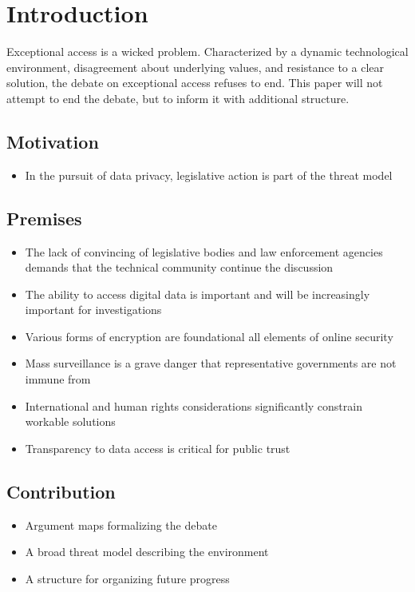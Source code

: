 \chapter{Introduction}

Exceptional access is a wicked problem. Characterized by a dynamic technological environment, disagreement about
underlying values, and resistance to a clear solution, the debate on exceptional access refuses to end. This paper will
not attempt to end the debate, but to inform it with additional structure.

\section{Motivation}

\begin{itemize}
    \item In the pursuit of data privacy, legislative action is part of the threat model
\end{itemize}

\section{Premises}

\begin{itemize}
    \item The lack of convincing of legislative bodies and law enforcement agencies demands that the technical community continue the discussion
    \item The ability to access digital data is important and will be increasingly important for investigations
    \item Various forms of encryption are foundational all elements of online security
    \item Mass surveillance is a grave danger that representative governments are not immune from
    \item International and human rights considerations significantly constrain workable solutions
    \item Transparency to data access is critical for public trust
\end{itemize}

\section{Contribution}

\begin{itemize}
    \item Argument maps formalizing the debate
    \item A broad threat model describing the environment
    \item A structure for organizing future progress
\end{itemize}
